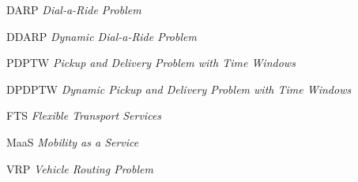 


\begin{siglas}
    \item[DARP] \textit{Dial-a-Ride Problem}
    \item[DDARP] \textit{Dynamic Dial-a-Ride Problem}
    \item[PDPTW] \textit{Pickup and Delivery Problem with Time Windows}
    \item[DPDPTW] \textit{Dynamic Pickup and Delivery Problem with Time 
                          Windows}
    \item[FTS] \textit{Flexible Transport Services}
    \item[MaaS] \textit{Mobility as a Service}
    \item[VRP] \textit{Vehicle Routing Problem}
\end{siglas}

